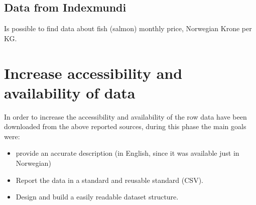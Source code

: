 \newpage


\subsection{Data from Indexmundi} 
Is possible to find data about fish (salmon) monthly price, Norwegian Krone per KG.\\


\section{Increase accessibility and availability of data}
In order to increase the accessibility and availability of the row data have been downloaded from the above reported sources, during this phase the main goals were:
\begin{itemize}
\item provide an accurate description (in English, since it was available just in Norwegian)
\item Report the data in a standard and reusable standard (CSV).
\item Design and build a easily readable dataset structure.
\end{itemize} 

